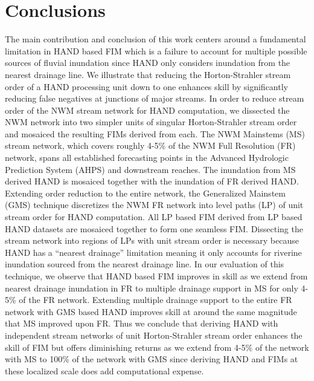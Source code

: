 \documentclass[draft]{dependencies/agujournal2019}
\begin{document}
\section{Conclusions}
\label{sec:conclusions}
%
The main contribution and conclusion of this work centers around a fundamental limitation in HAND based FIM which is a failure to account for multiple possible sources of fluvial inundation since HAND only considers inundation from the nearest drainage line.
We illustrate that reducing the Horton-Strahler stream order of a HAND processing unit down to one enhances skill by significantly reducing false negatives at junctions of major streams.
In order to reduce stream order of the NWM stream network for HAND computation, we dissected the NWM network into two simpler units of singular Horton-Strahler stream order and mosaiced the resulting FIMs derived from each.
The NWM Mainstems (MS) stream network, which covers roughly 4-5\% of the NWM Full Resolution (FR) network, spans all established forecasting points in the Advanced Hydrologic Prediction System (AHPS) and downstream reaches.
The inundation from MS derived HAND is mosaiced together with the inundation of FR derived HAND.
Extending order reduction to the entire network, the Generalized Mainstem (GMS) technique discretizes the NWM FR network into level paths (LP) of unit stream order for HAND computation.
All LP based FIM derived from LP based HAND datasets are mosaiced together to form one seamless FIM.
Dissecting the stream network into regions of LPs with unit stream order is necessary because HAND has a ``nearest drainage'' limitation meaning it only accounts for riverine inundation sourced from the nearest drainage line.
In our evaluation of this technique, we observe that HAND based FIM improves in skill as we extend from nearest drainage inundation in FR to multiple drainage support in MS for only 4-5\% of the FR network.
Extending multiple drainage support to the entire FR network with GMS based HAND improves skill at around the same magnitude that MS improved upon FR.
Thus we conclude that deriving HAND with independent stream networks of unit Horton-Strahler stream order enhances the skill of FIM but offers diminishing returns as we extend from 4-5\% of the network with MS to 100\% of the network with GMS since deriving HAND and FIMs at these localized scale does add computational expense.
\end{document}
